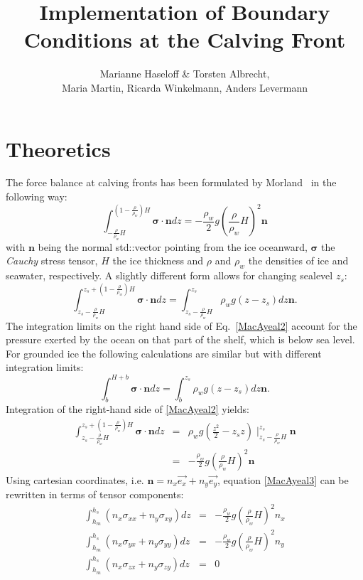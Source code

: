 \documentclass[a4paper,10pt]{article}
\title{Implementation of Boundary Conditions at the Calving Front}
\author{Marianne Haseloff \& Torsten Albrecht,\\ Maria Martin, Ricarda Winkelmann, Anders Levermann}
\begin{document}
\maketitle
\section{Theoretics}
The force balance at calving fronts has been formulated by Morland~\cite{Morland87} in the following way:
\begin{equation}%
\int_{-\frac{\rho}{\rho_w}H}^{(1-\frac{\rho}{\rho_w})H}\mathbf{\sigma}\cdot\mathbf{n}dz = -\frac{\rho_w}{2}g\left(\frac{\rho}{\rho_w}H \right)^2\mathbf{n}
\label{MacAyeal1}
\end{equation}
with $\mathbf{n}$ being the normal std::vector pointing from the ice
oceanward, $\mathbf{\sigma}$ the \emph{Cauchy} stress tensor, $H$ the ice thickness and $\rho$ and $\rho_{w}$ the densities of ice and seawater, respectively. A slightly different form allows for changing sealevel $z_s$:
\begin{equation}
\int_{z_s-\frac{\rho}{\rho_w}H}^{z_s+(1-\frac{\rho}{\rho_w})H}\mathbf{\sigma}\cdot\mathbf{n}dz = \int_{z_s-\frac{\rho}{\rho_w}H}^{z_s}\rho_w g (z-z_s) dz\mathbf{n}.
\label{MacAyeal2}
\end{equation}
The integration limits on the right hand side of Eq.~\eqref{MacAyeal2} account for the pressure exerted by the ocean on that part of the shelf, which is below sea level. For grounded ice the following calculations are similar but with different integration limits:
\begin{equation}
\int_{b}^{H+b}\mathbf{\sigma}\cdot\mathbf{n}dz = \int_{b}^{z_s}\rho_w g (z-z_s) dz\mathbf{n}.
\label{BC_sheet}
\end{equation} 
Integration of the right-hand side of \eqref{MacAyeal2} yields:
\begin{eqnarray}
\int_{z_s-\frac{\rho}{\rho_w}H}^{z_s+(1-\frac{\rho}{\rho_w})H}\mathbf{\sigma}\cdot\mathbf{n}dz & = & \rho_w g \left(\frac{z^2}{2}-z_s z\right)\mid_{z_s-\frac{\rho}{\rho_w}H}^{z_s}\mathbf{n} \\
& = &  -\frac{\rho_w}{2}g\left(\frac{\rho}{\rho_w}H \right)^2\mathbf{n}  \label{MacAyeal3} 
\end{eqnarray}
\noindent Using cartesian coordinates,
i.e. $\mathbf{n}=n_x\overrightarrow{e_x}+n_y\overrightarrow{e_y}$, equation
\eqref{MacAyeal3} can be rewritten in terms of tensor components:
\begin{eqnarray*}
\int_{h_m}^{h_s}(n_x\sigma_{xx}+n_y\sigma_{xy})dz & = & -\frac{\rho_w}{2}g\left(\frac{\rho}{\rho_w}H\right)^2n_x  \\
\int_{h_m}^{h_s}(n_x\sigma_{yx}+n_y\sigma_{yy})dz & = & -\frac{\rho_w}{2}g\left(\frac{\rho}{\rho_w}H\right)^2n_y  \\
\int_{h_m}^{h_s}(n_x\sigma_{zx}+n_y\sigma_{zy})dz & = & 0
\end{eqnarray*}
\end{document}
